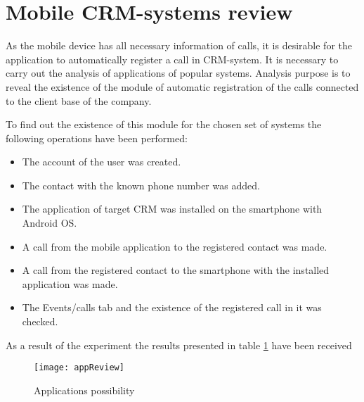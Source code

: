 \section{Mobile CRM-systems review}\label{sec:review}

As the mobile device has all necessary information of calls, it is desirable for the application to automatically register a call in CRM-system. It is necessary to carry out the analysis of applications of popular systems. Analysis purpose is to reveal the existence of the module of automatic registration of the calls connected to the client base of the company.

To find out the existence of this module for the chosen set of systems the following operations have been performed:

\begin {itemize}
\item The account of the user was created.
\item The contact with the known phone number was added.
\item The application of target CRM was installed on the smartphone with Android OS.
\item A call from the mobile application to the registered contact was made.
\item A call from the registered contact to the smartphone with the installed application was made.
\item The Events/calls tab and the existence of the registered call in it was checked.
\end {itemize}

As a result of the experiment the results presented in table \ref{fig:appReview} have been received

\begin{figure}[tbh]
\centering
\caption{Applications possibility}
\label{fig:appReview}
\texttt{[image: appReview]}
\end{figure}
